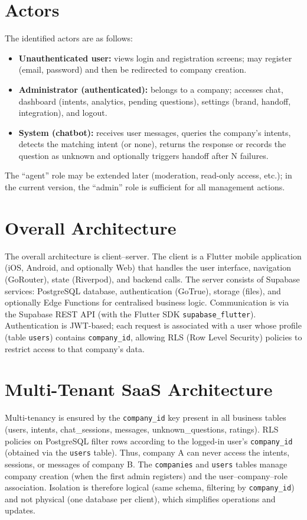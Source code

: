 \documentclass[12pt,a4paper]{report}
\begin{document}
\section{Actors}

The identified actors are as follows:

\begin{itemize}
  \item \textbf{Unauthenticated user:} views login and registration screens; may register (email, password) and then be redirected to company creation.
  \item \textbf{Administrator (authenticated):} belongs to a company; accesses chat, dashboard (intents, analytics, pending questions), settings (brand, handoff, integration), and logout.
  \item \textbf{System (chatbot):} receives user messages, queries the company's intents, detects the matching intent (or none), returns the response or records the question as unknown and optionally triggers handoff after N failures.
\end{itemize}

The ``agent'' role may be extended later (moderation, read-only access, etc.); in the current version, the ``admin'' role is sufficient for all management actions.

\section{Overall Architecture}

The overall architecture is client--server. The client is a Flutter mobile application (iOS, Android, and optionally Web) that handles the user interface, navigation (GoRouter), state (Riverpod), and backend calls. The server consists of Supabase services: PostgreSQL database, authentication (GoTrue), storage (files), and optionally Edge Functions for centralised business logic. Communication is via the Supabase REST API (with the Flutter SDK \texttt{supabase\_flutter}). Authentication is JWT-based; each request is associated with a user whose profile (table \texttt{users}) contains \texttt{company\_id}, allowing RLS (Row Level Security) policies to restrict access to that company's data.

\section{Multi-Tenant SaaS Architecture}

Multi-tenancy is ensured by the \texttt{company\_id} key present in all business tables (users, intents, chat\_sessions, messages, unknown\_questions, ratings). RLS policies on PostgreSQL filter rows according to the logged-in user's \texttt{company\_id} (obtained via the \texttt{users} table). Thus, company A can never access the intents, sessions, or messages of company B. The \texttt{companies} and \texttt{users} tables manage company creation (when the first admin registers) and the user--company--role association. Isolation is therefore logical (same schema, filtering by \texttt{company\_id}) and not physical (one database per client), which simplifies operations and updates.
\end{document}

